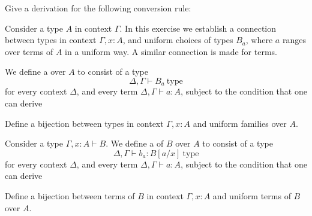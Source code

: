
\begin{exercises}
\item \label{ex:term_conversion}Give a derivation for the following conversion rule:
\begin{prooftree}
\end{prooftree}
\item Consider a type $A$ in context $\Gamma$. In this exercise we establish a connection between types in context $\Gamma,x:A$, and uniform choices of types $B_a$, where $a$ ranges over terms of $A$ in a uniform way. A similar connection is made for terms.
  \begin{subexenum}
  \item We define a  over $A$ to consist of a type
    \begin{equation*}
      \Delta,\Gamma\vdash B_a~\mathrm{type}
    \end{equation*}
    for every context $\Delta$, and every term $\Delta,\Gamma\vdash a:A$, subject to the condition that one can derive
    \begin{prooftree}
    \end{prooftree}
    Define a bijection between types in context $\Gamma,x:A$ and uniform families over $A$. 
  \item Consider a type $\Gamma,x:A\vdash B$. We define a  of $B$ over $A$ to consist of a type
    \begin{equation*}
      \Delta,\Gamma\vdash b_a:B[a/x]~\mathrm{type}
    \end{equation*}
    for every context $\Delta$, and every term $\Delta,\Gamma\vdash a:A$, subject to the condition that one can derive
    \begin{prooftree}
    \end{prooftree}
    Define a bijection between terms of $B$ in context $\Gamma,x:A$ and uniform terms of $B$ over $A$. 
  \end{subexenum}
\end{exercises}
